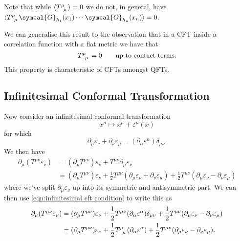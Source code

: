 \documentclass[fleqn]{NotesClass}
\newcommand{\quantumField}[1]{\symcal{#1}}
\DeclarePairedDelimiter{\correlator}{\langle}{\rangle}
\begin{document}
    Note that while \(\correlator{\tensor{T}{^\mu_\mu}} = 0\) we do not, in general, have \(\correlator{\tensor{T}{^\mu_\mu}\quantumField{O}_{h_1}(x_1) \dotsm \quantumField{O}_{h_n}(x_n)} = 0\).
    
    We can generalise this result to the observation that in a CFT inside a correlation function with a flat metric we have that
    \begin{equation}
        \tensor{T}{^\mu_\mu} = 0 \qquad \text{up to contact terms}.
    \end{equation}
    This property is characteristic of CFTs amongst QFTs.
    
    \subsection{Infinitesimal Conformal Transformation}
    Now consider an infinitesimal conformal transformation
    \begin{equation}
        x^\mu \mapsto x^\mu + \varepsilon^\mu(x)
    \end{equation}
    for which
    \begin{equation}
        \label{eqn:infinitesimal cft condition}
        \partial_\mu \varepsilon_\nu + \partial_\nu \varepsilon_\mu = (\partial_\alpha \varepsilon^\alpha) \delta_{\mu\nu}.
    \end{equation}
    We then have
    \begin{align}
        \partial_\mu (T^{\mu\nu}\varepsilon_\nu) &= (\partial_\mu T^{\mu\nu})\varepsilon_\nu + T^{\mu\nu}\partial_\mu \varepsilon_\nu\\
        &= (\partial_\mu T^{\mu\nu})\varepsilon_\nu + \frac{1}{2}T^{\mu\nu}(\partial_\mu \varepsilon_\nu + \partial_\nu \varepsilon_\mu) + \frac{1}{2}T^{\mu\nu}(\partial_\mu \varepsilon_\nu - \partial_\nu \varepsilon_\mu)
    \end{align}
    where we've split \(\partial_\mu \varepsilon_\nu\) up into its symmetric and antisymmetric part.
    We can then use \cref{eqn:infinitesimal cft condition} to write this as
    \begin{align}
        \partial_\mu (T^{\mu\nu}\varepsilon_\nu) &= (\partial_\mu T^{\mu\nu})\varepsilon_\nu + \frac{1}{2}T^{\mu\nu}(\partial_\alpha \varepsilon^\alpha)\delta_{\mu\nu} + \frac{1}{2}T^{\mu\nu}(\partial_\mu \varepsilon_\nu - \partial_\nu \varepsilon_\mu)\\
        &= (\partial_\mu T^{\mu\nu})\varepsilon_\nu + \frac{1}{2}\tensor{T}{^\mu_\mu}(\partial_\alpha \varepsilon^\alpha) + \frac{1}{2}T^{\mu\nu}(\partial_\mu \varepsilon_\nu - \partial_\nu \varepsilon_\mu).
    \end{align}
\end{document}
